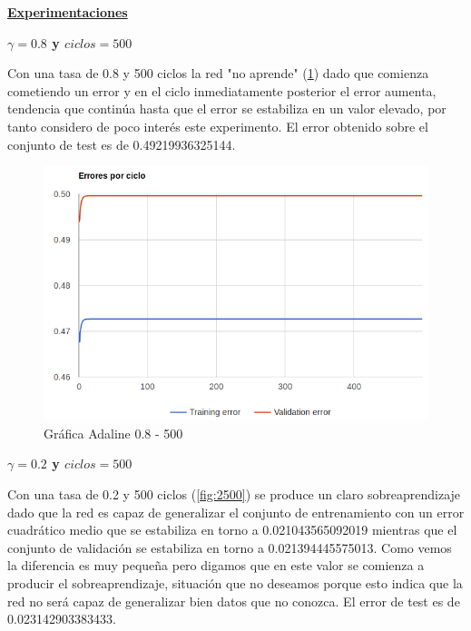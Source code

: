 \documentclass[11pt,spanish,listoffigures,listoftables]{workluis}
\begin{document}
\par \underline{\textbf{Experimentaciones}}

\par \textbf{$\gamma = 0.8$ y $ciclos = 500$}

\par Con una tasa de 0.8 y 500 ciclos la red "no aprende" (\ref{fig:8500}) dado que comienza cometiendo un error y en el ciclo inmediatamente posterior el error aumenta, tendencia que continúa hasta que el error se estabiliza en un valor elevado, por tanto considero de poco interés este experimento. El error obtenido sobre el conjunto de test es de 0.49219936325144.

\begin{figure}[H]
\centering
\includegraphics[scale=0.5]{8500}
\caption{Gráfica Adaline 0.8 - 500}\label{fig:8500}
\end{figure}

\par \textbf{$\gamma = 0.2$ y $ciclos = 500$}

\par Con una tasa de 0.2 y 500 ciclos (\ref{fig:2500}) se produce un claro sobreaprendizaje dado que la red es capaz de generalizar el conjunto de entrenamiento con un error cuadrático medio que se estabiliza en torno a 0.021043565092019 mientras que el conjunto de validación se estabiliza en torno a 0.021394445575013. Como vemos la diferencia es muy pequeña pero digamos que en este valor se comienza a producir el sobreaprendizaje, situación que no deseamos porque esto indica que la red no será capaz de generalizar bien datos que no conozca. El error de test es de 0.023142903383433.
\end{document}
